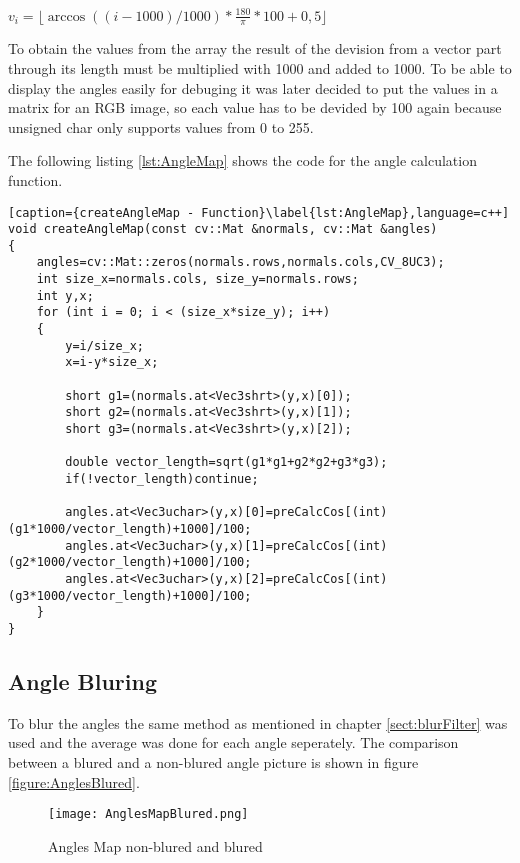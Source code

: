 $v_i=\lfloor \arccos ((i-1000)/1000) * \frac{180}{\pi}*100 + 0,5 \rfloor$

To obtain the values from the array the result of the devision from a vector part through its length
must be multiplied with 1000 and added to 1000. To be able to display the angles easily for debuging 
it was later decided to put the values in a matrix for an RGB image, so each value has to be devided 
by 100 again because unsigned char only supports values from 0 to 255.

The following listing \vref{lst:AngleMap} shows the code for the angle calculation function.

\begin{lstlisting}[caption={createAngleMap - Function}\label{lst:AngleMap},language=c++]
void createAngleMap(const cv::Mat &normals, cv::Mat &angles)
{
	angles=cv::Mat::zeros(normals.rows,normals.cols,CV_8UC3);
	int size_x=normals.cols, size_y=normals.rows;
	int y,x;
	for (int i = 0; i < (size_x*size_y); i++)
	{ 
		y=i/size_x;
		x=i-y*size_x;

		short g1=(normals.at<Vec3shrt>(y,x)[0]);
		short g2=(normals.at<Vec3shrt>(y,x)[1]);
		short g3=(normals.at<Vec3shrt>(y,x)[2]);

		double vector_length=sqrt(g1*g1+g2*g2+g3*g3);
		if(!vector_length)continue;

		angles.at<Vec3uchar>(y,x)[0]=preCalcCos[(int)(g1*1000/vector_length)+1000]/100;
		angles.at<Vec3uchar>(y,x)[1]=preCalcCos[(int)(g2*1000/vector_length)+1000]/100;
		angles.at<Vec3uchar>(y,x)[2]=preCalcCos[(int)(g3*1000/vector_length)+1000]/100;
	}
}	
\end{lstlisting}

\subsection{Angle Bluring}

To blur the angles the same method as mentioned in chapter \vref{sect:blurFilter} was used and
the average was done for each angle seperately. The comparison between a blured and a non-blured
angle picture is shown in figure \vref{figure:AnglesBlured}.

\begin{figure}[htp]
\begin{center}
  \texttt{[image: AnglesMapBlured.png]}
  \caption{Angles Map non-blured and blured}
  \label{figure:AnglesBlured}
\end{center}
\end{figure}




